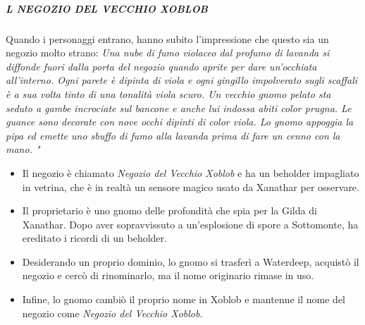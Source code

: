 \documentclass{article}
\begin{document}
                    \subparagraph{L NEGOZIO DEL VECCHIO XOBLOB} Quando i personaggi entrano, hanno subito l'impressione che questo sia un negozio molto strano:\newline
                        \textit{Una nube di fumo violaceo dal profumo di lavanda si diffonde fuori dalla porta del negozio quando aprite per dare un'occhiata all'interno. Ogni parete è dipinta di viola e ogni gingillo impolverato sugli scaffali è a sua volta tinto di una tonalità viola scuro. Un vecchio gnomo pelato sta seduto a gambe incrociate sul bancone e anche lui indossa abiti color prugna. Le guance sono decorate con nove occhi dipinti di color viola. 
                        Lo gnomo appoggia la pipa ed emette uno sbuffo di fumo alla lavanda prima di fare un cenno con la mano. 
                       "}\newline
                       \begin{itemize}
                        \item Il negozio è chiamato \textit{Negozio del Vecchio Xoblob} e ha un beholder impagliato in vetrina, che è in realtà un sensore magico usato da Xanathar per osservare.
                        \item Il proprietario è uno gnomo delle profondità che spia per la Gilda di Xanathar. Dopo aver sopravvissuto a un'esplosione di spore a Sottomonte, ha ereditato i ricordi di un beholder.
                        \item Desiderando un proprio dominio, lo gnomo si trasferì a Waterdeep, acquistò il negozio e cercò di rinominarlo, ma il nome originario rimase in uso.
                        \item Infine, lo gnomo cambiò il proprio nome in Xoblob e mantenne il nome del negozio come \textit{Negozio del Vecchio Xoblob}.
                    \end{itemize}
\end{document}
